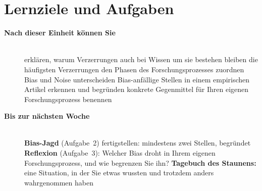 \section{Lernziele und Aufgaben}
\begin{description}
\item[{\rot\bf Nach dieser Einheit können Sie}]~\\[-\lblskip]
\bi
  \ite erklären, warum Verzerrungen auch bei Wissen um sie bestehen
    bleiben
  \ite die häufigsten Verzerrungen den Phasen des Forschungsprozesses
    zuordnen
  \ite Bias und Noise unterscheiden
  \ite Bias-anfällige Stellen in einem empirischen Artikel erkennen und
    begründen
  \ite konkrete Gegenmittel für Ihren eigenen Forschungsprozess benennen
\ei
\os{\newpage}

\item[{\rot\bf Bis zur nächsten Woche}]~\\[-\lblskip]
\bi
  \ite \textbf{Bias-Jagd} (Aufgabe~2) fertigstellen: mindestens zwei
    Stellen, begründet
  \ite \textbf{Reflexion} (Aufgabe~3): Welcher Bias droht in Ihrem
    eigenen Forschungsprozess, und wie begrenzen Sie ihn?
  \ite \textbf{Tagebuch des Staunens:} eine Situation, in der Sie etwas
    wussten und trotzdem anders wahrgenommen haben
\ei
\os{\newpage}
\end{description}

